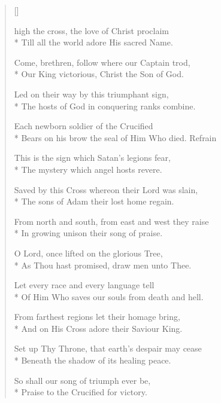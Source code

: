 \newHymn

\JustHymnNum

\begin{verse}[\versewidth]
\begin{indentedVerse}
 \vin {} high the cross, the love of Christ proclaim \\*
\vin Till all the world adore His sacred Name.
\end{indentedVerse}

 Come, brethren, follow where our Captain trod,\\*
Our King victorious, Christ the Son of God.

 Led on their way by this triumphant sign,\\*
The hosts of God in conquering ranks combine.

 Each newborn soldier of the Crucified\\*
Bears on his brow the seal of Him Who died. Refrain

 This is the sign which Satan's legions fear,\\*
The mystery which angel hosts revere. 

 Saved by this Cross whereon their Lord was slain,\\*
The sons of Adam their lost home regain.

 From north and south, from east and west they raise\\*
In growing unison their song of praise.

 O Lord, once lifted on the glorious Tree,\\*
As Thou hast promised, draw men unto Thee.

 Let every race and every language tell\\*
Of Him Who saves our souls from death and hell.

 From farthest regions let their homage bring,\\*
And on His Cross adore their Saviour King.

 Set up Thy Throne, that earth's despair may cease\\*
Beneath the shadow of its healing peace.

 So shall our song of triumph ever be,\\*
Praise to the Crucified for victory.

\end{verse}

